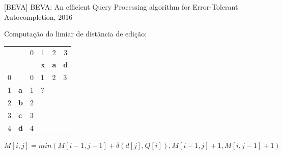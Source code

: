\documentclass[11pt]{beamer}
\begin{document}
\begin{frame}{[BEVA] BEVA: An efficient Query Processing algorithm for Error-Tolerant Autocompletion, 2016}

    Computação do limiar de distância de edição:
  
    \begin{table}[]
    \begin{tabular}{llllll}
     &  & \multicolumn{1}{c}{{\color[HTML]{656565} 0}} & \multicolumn{1}{c}{{\color[HTML]{656565} 1}} & \multicolumn{1}{c}{{\color[HTML]{656565} 2}} & \multicolumn{1}{c}{{\color[HTML]{656565} 3}} \\
     &  &  & \textbf{x} & \textbf{a} & \textbf{d} \\ \cline{3-6} 
    {\color[HTML]{656565} 0} & \multicolumn{1}{l|}{} & \multicolumn{1}{l|}{{\color[HTML]{000000} 0}} & \multicolumn{1}{l|}{{\color[HTML]{000000} 1}} & \multicolumn{1}{l|}{{\color[HTML]{000000} 2}} & \multicolumn{1}{l|}{{\color[HTML]{000000} 3}} \\ \cline{3-6} 
    {\color[HTML]{656565} 1} & \multicolumn{1}{l|}{\textbf{a}} & \multicolumn{1}{l|}{{\color[HTML]{000000} 1}} & \multicolumn{1}{l|}{{\color[HTML]{000000} ?}} & \multicolumn{1}{l|}{{\color[HTML]{000000} }} & \multicolumn{1}{l|}{{\color[HTML]{000000} }} \\ \cline{3-6} 
    {\color[HTML]{656565} 2} & \multicolumn{1}{l|}{\textbf{b}} & \multicolumn{1}{c|}{{\color[HTML]{000000} 2}} & \multicolumn{1}{c|}{{\color[HTML]{000000} }} & \multicolumn{1}{c|}{{\color[HTML]{000000} }} & \multicolumn{1}{c|}{{\color[HTML]{000000} }} \\ \cline{3-6} 
    {\color[HTML]{656565} 3} & \multicolumn{1}{l|}{\textbf{c}} & \multicolumn{1}{l|}{{\color[HTML]{000000} 3}} & \multicolumn{1}{l|}{{\color[HTML]{000000} }} & \multicolumn{1}{l|}{{\color[HTML]{000000} }} & \multicolumn{1}{l|}{{\color[HTML]{000000} }} \\ \cline{3-6} 
    {\color[HTML]{656565} 4} & \multicolumn{1}{l|}{\textbf{d}} & \multicolumn{1}{c|}{{\color[HTML]{000000} 4}} & \multicolumn{1}{c|}{{\color[HTML]{000000} }} & \multicolumn{1}{c|}{{\color[HTML]{000000} }} & \multicolumn{1}{c|}{{\color[HTML]{000000} }} \\ \cline{3-6} 
    \end{tabular}
    \end{table}
    
     \[ M[i, j] = min(M[i - 1, j - 1] + \delta(d[j], Q[i]), M[i - 1, j] + 1, M[i, j - 1] + 1) \]
    
\end{frame}
\end{document}
